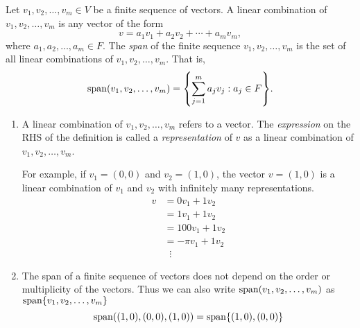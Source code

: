 \begin{defn} \label{defn:vector:span:finite_sequence}
    Let $v_{1}, v_{2}, \dots, v_{m} \in V$ be a finite sequence of vectors.
    A linear combination of $v_{1}, v_{2}, \dots, v_{m}$ is any vector of the form \[
        v = a_{1} v_{1} + a_{2} v_{2} + \cdots + a_{m} v_{m},
    \] where $a_{1}, a_{2}, \dots, a_{m} \in F$.
    The \emph{span} of the finite sequence $v_{1}, v_{2}, \dots, v_{m}$ is the set of all linear combinations of $v_{1}, v_{2}, \dots, v_{m}$.
    That is, \[
        \spann(v_{1}, v_{2}, \dots, v_{m}) = \set{\sum_{j = 1}^{m} a_{j} v_{j} : a_{j} \in F}.
    \]
\end{defn}
\begin{rem} \leavevmode
    \begin{enumerate}[label=(\alph*)]
        \item A linear combination of $v_{1}, v_{2}, \dots, v_{m}$ refers to a vector.
        The \emph{expression} on the RHS of the definition is called a \emph{representation} of $v$ as a linear combination of $v_{1}, v_{2}, \dots, v_{m}$.

        For example, if $v_{1} = (0, 0)$ and $v_{2} = (1, 0)$, the vector $v = (1, 0)$ is a linear combination of $v_{1}$ and $v_{2}$ with infinitely many representations.
        \begin{align*}
            v &= 0 v_{1} + 1 v_{2} \\
            &= 1 v_{1} + 1 v_{2} \\
            &= 100 v_{1} + 1 v_{2} \\
            &= -\pi v_{1} + 1 v_{2} \\
            &\;\;\vdots
        \end{align*}
        \item The span of a finite sequence of vectors does not depend on the order or multiplicity of the vectors.
        Thus we can also write $\operatorname{span}(v_{1}, v_{2}, \dots, v_{m})$ as $\spann\set{v_{1}, v_{2}, \dots, v_{m}}$ \[
            \spann((1, 0), (0, 0), (1, 0)) = \spann\set{(1, 0), (0, 0)}
        \]
    \end{enumerate}
\end{rem}
